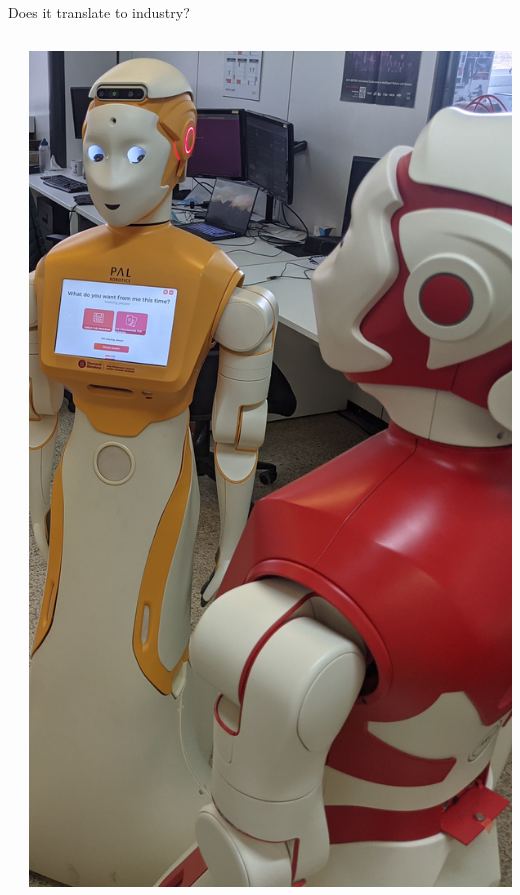 \documentclass[xcolor=table,aspectratio=169]{beamer}
\begin{document}
\begin{frame}{Does it translate to industry?}
\begin{columns}
\begin{column}{0.7\linewidth}
        \end{column}
        \begin{column}{0.3\linewidth}
            \begin{center}
                \includegraphics[height=0.7\pageheight]{figs/aris.jpg}
            \end{center}
        \end{column}
    \end{columns}


\end{frame}
\end{document}

